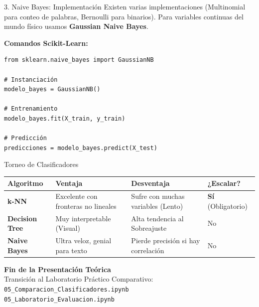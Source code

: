 \documentclass{beamer}
\begin{document}
\begin{frame}[fragile]{3. Naive Bayes: Implementación}
    Existen varias implementaciones (Multinomial para conteo de palabras, Bernoulli para binarios). Para variables continuas del mundo físico usamos \textbf{Gaussian Naive Bayes}.
    
    \vspace{0.3cm}
    \textbf{Comandos Scikit-Learn:}
    \begin{verbatim}
from sklearn.naive_bayes import GaussianNB

# Instanciación
modelo_bayes = GaussianNB()

# Entrenamiento
modelo_bayes.fit(X_train, y_train)

# Predicción
predicciones = modelo_bayes.predict(X_test)
    \end{verbatim}
\end{frame}

\begin{frame}{Torneo de Clasificadores}
    \begin{table}[]
    \centering
    \begin{tabular}{|p{2.5cm}|p{2.5cm}|p{2.5cm}|p{2cm}|}
    \hline
    \textbf{Algoritmo} & \textbf{Ventaja} & \textbf{Desventaja} & \textbf{¿Escalar?} \\ \hline
    \textbf{k-NN} & Excelente con fronteras no lineales & Sufre con muchas variables (Lento) & \textbf{Sí} (Obligatorio) \\ \hline
    \textbf{Decision Tree} & Muy interpretable (Visual) & Alta tendencia al Sobreajuste & No \\ \hline
    \textbf{Naive Bayes} & Ultra veloz, genial para texto & Pierde precisión si hay correlación & No \\ \hline
    \end{tabular}
    \end{table}
\end{frame}

\begin{frame}[fragile]
    \begin{center}
        \Large \textbf{Fin de la Presentación Teórica}\\
        \vspace{0.5cm}
        \normalsize Transición al Laboratorio Práctico Comparativo:\\
        \vspace{0.2cm}
        \verb|05_Comparacion_Clasificadores.ipynb|\\
        \vspace{0.2cm}
        \verb|05_Laboratorio_Evaluacion.ipynb|
    \end{center}
\end{frame}
\end{document}
